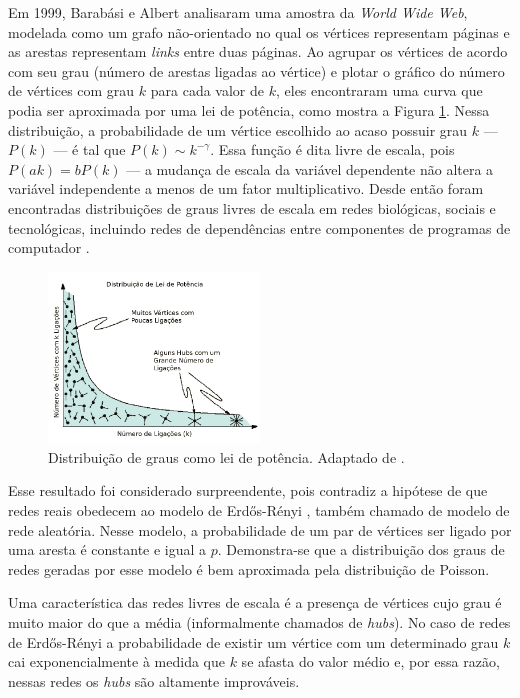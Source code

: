 \documentclass{article}
\begin{document}
Em 1999, Barabási e Albert \cite{Barabasi1999} analisaram uma amostra da \textit{World Wide Web}, modelada como um grafo não-orientado no qual os vértices representam páginas e as arestas representam \textit{links} entre duas páginas. Ao agrupar os vértices de acordo com seu grau (número de arestas ligadas ao vértice) e plotar o gráfico do número de vértices com grau $k$ para cada valor de $k$, eles encontraram uma curva que podia ser aproximada por uma lei de potência, como mostra a Figura \ref{fig:leidepotencia}. Nessa distribuição, a probabilidade de um vértice escolhido ao acaso possuir grau $k$ --- $P(k)$ --- é tal que $P(k) \sim k^{-\gamma}$. Essa função é dita livre de escala, pois $P(ak) = bP(k)$ --- a mudança de escala da variável dependente não altera a variável independente a menos de um fator multiplicativo. Desde então foram encontradas distribuições de graus livres de escala em redes biológicas, sociais e tecnológicas, incluindo redes de dependências entre componentes de programas de computador \cite{Valverde2003}.

\begin{figure} \label{fig:leidepotencia}
\centering
\includegraphics[width=0.5\textwidth]{leidepotencia}
\caption{Distribuição de graus como lei de potência. Adaptado de \cite{Barabasi2007}.}
\end{figure}

Esse resultado foi considerado surpreendente, pois contradiz a hipótese de que redes reais obedecem ao modelo de Erdős-Rényi \cite{Erdos1959}, também chamado de modelo de rede aleatória. Nesse modelo, a probabilidade de um par de vértices ser ligado por uma aresta é constante e igual a $p$. Demonstra-se que a distribuição dos graus de redes geradas por esse modelo é bem aproximada pela distribuição de Poisson.

Uma característica das redes livres de escala é a presença de vértices cujo grau é muito maior do que a média (informalmente chamados de \textit{hubs}). No caso de redes de Erdős-Rényi a probabilidade de existir um vértice com um determinado grau $k$ cai exponencialmente à medida que $k$ se afasta do valor médio e, por essa razão, nessas redes os \textit{hubs} são altamente improváveis.
\end{document}
